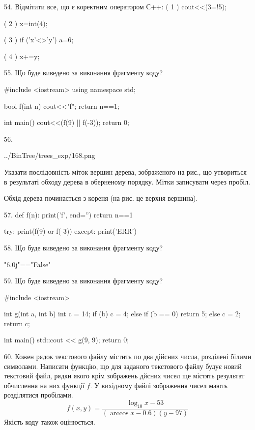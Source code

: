 \documentclass[11pt]{article}
\begin{document}

54. %
Відмітити все, що є коректним оператором С++:
( 1 ) cout<<(3=!5);

( 2 ) x=int(4);

( 3 ) if ('x'<>'y') a=6;

( 4 ) x+=y;


55. Що буде виведено за виконання фрагменту коду?

#include <iostream>
using namespace std;

bool f(int n){
    cout<<"f";
    return n==1;
}

int main(){
    cout<<(f(9) || f(-3));
    return 0;
}


56. 

\begin{center}
	{../BinTree/trees_exp/168.png}
\end{center}
Указати послідовність міток вершин дерева, зображеного на рис., що утвориться в результаті обходу дерева в оберненому порядку. Мітки записувати через пробіл.\par Обхід дерева починається з кореня (на рис. це верхня вершина).


57. 
def f(n):
    print('f', end='')
    return n==1

try:
    print(f(9) or f(-3))
except:
    print('ERR')


58. Що буде виведено за виконання фрагменту коду?

"6.0j"=="False"


59. Що буде виведено за виконання фрагменту коду?

#include <iostream>

int g(int a, int b){
    int c = 14;
    if (b)
        c = 4;
    else if (b == 0)
         return 5;
    else 
        c = 2;
    return c;
}

int main(){
    std::cout << g(9, 9);
    return 0;
}


60. 
Кожен рядок текстового файлу містить по два дійсних числа, розділені білими символами.
Написати функцію, що для заданого текстового файлу будує новий текстовий файл, рядки якого крім зображень дйсних чисел ще містять результат обчислення на них функції $f$. У вихідному файлі зображення чисел мають розділятися пробілами. 
$$f(x, y) =\frac{\log_{10} x - 53}{(\arccos x - 0.6) (y - 97)}$$ 
Якість коду також оцінюється.
\end{document}
